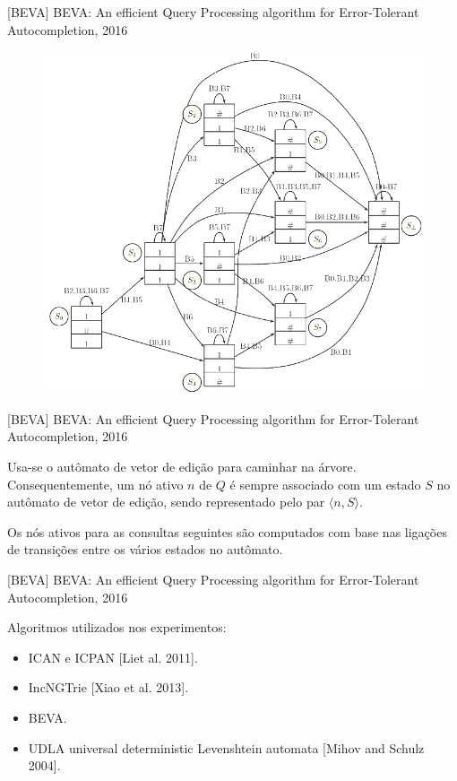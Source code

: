 \documentclass[11pt]{beamer}
\begin{document}
\begin{frame}{[BEVA] BEVA: An efficient Query Processing algorithm for Error-Tolerant Autocompletion, 2016}

    \begin{figure}
      \includegraphics[scale=0.33]{pictures/edit_vector_automata_beva.png}
      \centering
    \end{figure}
   
\end{frame}

\begin{frame}{[BEVA] BEVA: An efficient Query Processing algorithm for Error-Tolerant Autocompletion, 2016}

    Usa-se o autômato de vetor de edição para caminhar na árvore. Consequentemente, um nó ativo $n$ de $Q$ é sempre associado com um estado $S$ no autômato de vetor de edição, sendo representado pelo par $\langle n, S \rangle$.
    
    Os nós ativos para as consultas seguintes são computados com base nas ligações de transições entre os vários estados no autômato.
   
\end{frame}

\begin{frame}{[BEVA] BEVA: An efficient Query Processing algorithm for Error-Tolerant Autocompletion, 2016}

    Algoritmos utilizados nos experimentos:
    
    \begin{itemize}
        \item ICAN e ICPAN [Liet al. 2011].
        \item IncNGTrie [Xiao et al. 2013].
        \item BEVA.
        \item UDLA universal deterministic Levenshtein automata [Mihov and Schulz 2004].
    \end{itemize}
   
\end{frame}
\end{document}
